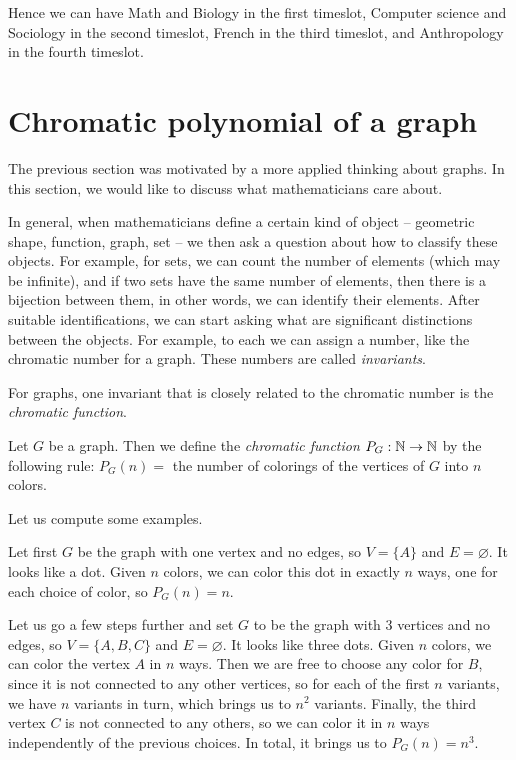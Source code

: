 Hence we can have Math and Biology in the first timeslot, Computer science and Sociology in the second timeslot, French in the third timeslot, and Anthropology in the fourth timeslot.



\section{Chromatic polynomial of a graph}

The previous section was motivated by a more applied thinking about graphs. In this section, we would like to discuss what mathematicians care about.

In general, when mathematicians define a certain kind of object -- geometric shape, function, graph, set -- we then ask a question about how to classify these objects. For example, for sets, we can count the number of elements (which may be infinite), and if two sets have the same number of elements, then there is a bijection between them, in other words, we can identify their elements. After suitable identifications, we can start asking what are significant distinctions between the objects. For example, to each we can assign a number, like the chromatic number for a graph. These numbers are called \emph{invariants}.

For graphs, one invariant that is closely related to the chromatic number is the \emph{chromatic function}.

\begin{definition}
Let $G$ be a graph. Then we define the \emph{chromatic function} $P_G: \mathbb{N} \to \mathbb{N}$ by the following rule:
$P_G(n)=$ the number of colorings of the vertices of $G$ into $n$ colors.
\end{definition}

Let us compute some examples.

\begin{example}
Let first $G$ be the graph with one vertex and no edges, so $V = \{A\}$ and $E = \varnothing$. It looks like a dot. Given $n$ colors, we can color this dot in exactly $n$ ways, one for each choice of color, so $P_G(n) = n$.
\end{example}

\begin{example}
Let us go a few steps further and set $G$ to be the graph with 3 vertices and no edges, so $V = \{A,B,C\}$ and $E = \varnothing$. It looks like three dots. Given $n$ colors, we can color the vertex $A$ in $n$ ways. Then we are free to choose any color for $B$, since it is not connected to any other vertices, so for each of the first $n$ variants, we have $n$ variants in turn, which brings us to $n^2$ variants. Finally, the third vertex $C$ is not connected to any others, so we can color it  in $n$ ways independently of the previous choices. In total, it brings us to $P_G(n) = n^3$. 
\end{example}

